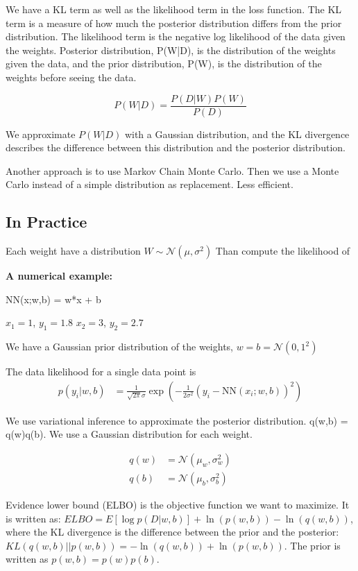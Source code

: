 We have a KL term as well as the likelihood term in the loss function. The KL term is a measure of how much the posterior distribution differs from the prior distribution. The likelihood term is the negative log likelihood of the data given the weights. Posterior distribution, P(W|D), is the distribution of the weights given the data, and the prior distribution, P(W), is the distribution of the weights before seeing the data.

\begin{equation}
  P(W|D) = \frac{P(D|W)P(W)}{P(D)}
\end{equation}

We approximate \( P(W|D) \) with a Gaussian distribution, and the KL divergence describes the difference between this distribution and the posterior distribution.

Another approach is to use Markov Chain Monte Carlo. Then we use a Monte Carlo instead of a simple distribution as replacement. Less efficient.

\subsection{In Practice}

Each weight have a distribution
\( W \sim \mathcal{N}(\mu, \sigma^2) \)
\newline
Than compute the likelihood of

\textbf{A numerical example:}

NN(x;w,b) = w*x + b

$x_1 = 1$, $y_1 = 1.8$
$x_2 = 3$, $y_2 = 2.7$

We have a Gaussian prior distribution of the weights, \( w = b = \mathcal{N}(0, 1^{2}) \)

The data likelihood for a single data point is
\begin{align}
  p(y_i|w,b) & = \frac{1}{\sqrt{2\pi}\sigma} \exp\left(-\frac{1}{2\sigma^2}(y_i - \text{NN}(x_i;w,b))^2\right)
\end{align}

We use variational inference to approximate the posterior distribution. q(w,b) = q(w)q(b). We use a Gaussian distribution for each weight.

\begin{align}
  q(w) & = \mathcal{N}(\mu_w, \sigma_w^2) \\
  q(b) & = \mathcal{N}(\mu_b, \sigma_b^2)
\end{align}

Evidence lower bound (ELBO) is the objective function we want to maximize. It is written as: $ELBO = E[\log p(D|w,b)] + \ln(p(w,b)) - \ln(q(w,b))$, where the KL divergence is the difference between the prior and the posterior: $KL(q(w,b)||p(w,b)) = -\ln(q(w,b)) + \ln(p(w,b))$. The prior is written as $p(w,b) = p(w)p(b)$.


